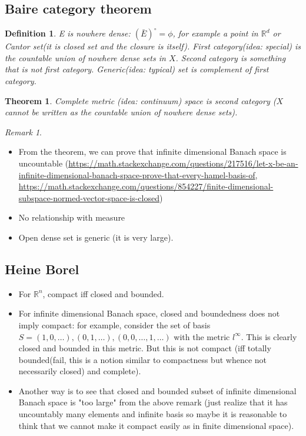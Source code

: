 \documentclass{article}
\newtheorem{theorem}{Theorem}
\newtheorem{definition}{Definition}
\theoremstyle{remark}
\newtheorem{remark}[example]{Remark}
\begin{document}
\subsection*{Baire category theorem}
\begin{definition}
E is nowhere dense: $(\bar E)^\circ=\phi$, for example a point in $\mathbb{R}^d$ or Cantor set(it is closed set and the closure is itself).
First category(idea: special) is the countable union of nowhere dense sets in $X$. Second category is something that is not first category. Generic(idea: typical) set is complement of first category.
\end{definition}
\begin{theorem}
Complete metric (idea: continuum) space is second category ($X$ cannot be written as the countable union of nowhere dense sets).
\end{theorem}
\begin{remark}
\begin{itemize}
    \item From the theorem, we can prove that infinite dimensional Banach space is uncountable (\url{https://math.stackexchange.com/questions/217516/let-x-be-an-infinite-dimensional-banach-space-prove-that-every-hamel-basis-of}, \url{https://math.stackexchange.com/questions/854227/finite-dimensional-subspace-normed-vector-space-is-closed})
    \item No relationship with measure
    \item Open dense set is generic (it is very large).
\end{itemize}
\end{remark}
\subsection*{Heine Borel}
\begin{itemize}
    \item For $\mathbb{R}^n$, compact iff closed and bounded.
    \item For infinite dimensional Banach space, closed and boundedness does not imply compact: for example, consider the set of basis $S=(1,0,\dots), (0, 1, \dots), (0, 0, \dots, 1, \dots)$ with the metric $l^\infty$. This is clearly closed and bounded in this metric. But this is not compact (iff totally bounded(fail, this is a notion similar to compactness but whence not necessarily closed) and complete).
    \item Another way is to see that closed and bounded subset of infinite dimensional Banach space is "too large" from the above remark (just realize that it has uncountably many elements and infinite basis so maybe it is reasonable to think that we cannot make it compact easily as in finite dimensional space).
\end{itemize}
\end{document}

